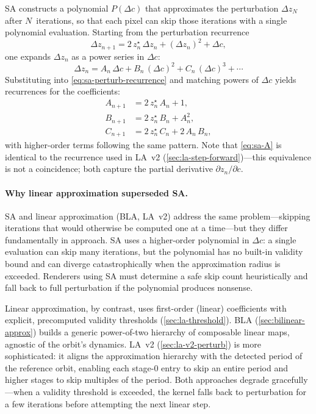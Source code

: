 SA constructs a polynomial $P(\Delta c)$ that approximates the
perturbation $\Delta z_N$ after $N$~iterations, so that each pixel can
skip those iterations with a single polynomial evaluation.  Starting
from the perturbation recurrence
\begin{equation}
  \Delta z_{n+1} = 2\,z_n^\star\,\Delta z_n + (\Delta z_n)^2 + \Delta c,
  \label{eq:sa-perturb-recurrence}
\end{equation}
one expands $\Delta z_n$ as a power series in $\Delta c$:
\[
  \Delta z_n = A_n\,\Delta c + B_n\,(\Delta c)^2
             + C_n\,(\Delta c)^3 + \cdots
\]
Substituting into \cref{eq:sa-perturb-recurrence} and matching powers of
$\Delta c$ yields recurrences for the coefficients:
\begin{align}
  A_{n+1} &= 2\,z_n^\star\,A_n + 1,
    \label{eq:sa-A} \\
  B_{n+1} &= 2\,z_n^\star\,B_n + A_n^2,
    \label{eq:sa-B} \\
  C_{n+1} &= 2\,z_n^\star\,C_n + 2\,A_n\,B_n,
    \label{eq:sa-C}
\end{align}
with higher-order terms following the same pattern.  Note that
\cref{eq:sa-A} is identical to the  recurrence used in
LA~v2 (\cref{sec:la-step-forward})---this equivalence is not a coincidence; both
capture the partial derivative $\partial z_n / \partial c$.

\paragraph{Why linear approximation superseded SA.}
SA and linear approximation (BLA, LA~v2) address the same
problem---skipping iterations that would otherwise be computed one at a
time---but they differ fundamentally in approach.  SA uses a
higher-order polynomial in $\Delta c$: a single evaluation can skip many
iterations, but the polynomial has no built-in validity bound and can
diverge catastrophically when the approximation radius is exceeded.
Renderers using SA must determine a safe skip count heuristically and
fall back to full perturbation if the polynomial produces nonsense.

Linear approximation, by contrast, uses first-order (linear)
coefficients with explicit, precomputed validity thresholds
(\cref{sec:la-threshold}).  BLA (\cref{sec:bilinear-approx}) builds a
generic power-of-two hierarchy of composable linear maps, agnostic of
the orbit's dynamics.  LA~v2 (\cref{sec:la-v2-perturb}) is more
sophisticated: it aligns the approximation hierarchy with the detected
period of the reference orbit, enabling each stage-0 entry to skip an
entire period and higher stages to skip multiples of the period.  Both
approaches degrade gracefully---when a validity threshold is
exceeded, the kernel falls back to perturbation for a few
iterations before attempting the next linear step.

